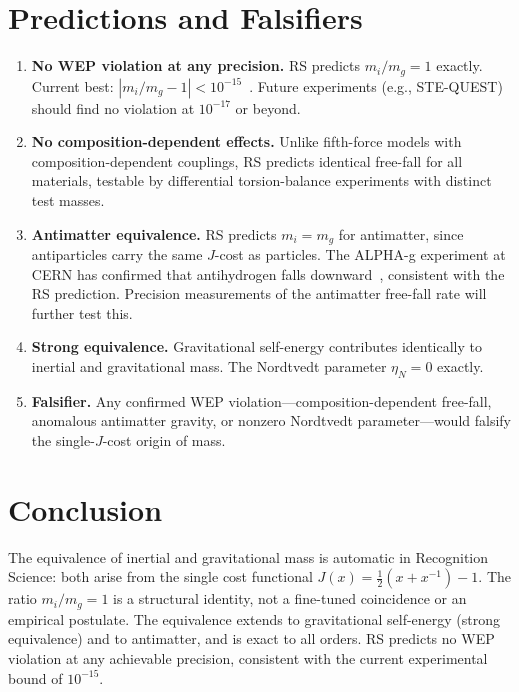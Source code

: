 \documentclass[12pt,a4paper]{article}
\theoremstyle{definition}
\theoremstyle{remark}
\begin{document}
\section{Predictions and Falsifiers}
\label{sec:predictions}

\begin{enumerate}
  \item \textbf{No WEP violation at any precision.}
  RS predicts $m_i / m_g = 1$ exactly.  Current best:
  $|m_i / m_g - 1| < 10^{-15}$~\cite{MICROSCOPE}.
  Future experiments (e.g., STE-QUEST) should find no
  violation at $10^{-17}$ or beyond.

  \item \textbf{No composition-dependent effects.}
  Unlike fifth-force models with composition-dependent
  couplings, RS predicts identical free-fall for all
  materials, testable by differential torsion-balance
  experiments with distinct test masses.

  \item \textbf{Antimatter equivalence.}
  RS predicts $m_i = m_g$ for antimatter, since antiparticles
  carry the same $J$-cost as particles.  The ALPHA-g experiment
  at CERN has confirmed that antihydrogen falls
  downward~\cite{ALPHAg}, consistent with the RS prediction.
  Precision measurements of the antimatter free-fall rate will
  further test this.

  \item \textbf{Strong equivalence.}
  Gravitational self-energy contributes identically to
  inertial and gravitational mass.  The Nordtvedt parameter
  $\eta_N = 0$ exactly.

  \item \textbf{Falsifier.}
  Any confirmed WEP violation---composition-dependent
  free-fall, anomalous antimatter gravity, or nonzero
  Nordtvedt parameter---would falsify the single-$J$-cost
  origin of mass.
\end{enumerate}

\section{Conclusion}
\label{sec:conclusion}

The equivalence of inertial and gravitational mass is automatic
in Recognition Science: both arise from the single cost
functional $J(x) = \tfrac{1}{2}(x + x^{-1}) - 1$.  The ratio
$m_i / m_g = 1$ is a structural identity, not a fine-tuned
coincidence or an empirical postulate.  The equivalence extends
to gravitational self-energy (strong equivalence) and to
antimatter, and is exact to all orders.  RS predicts no WEP
violation at any achievable precision, consistent with the
current experimental bound of $10^{-15}$.
\end{document}
